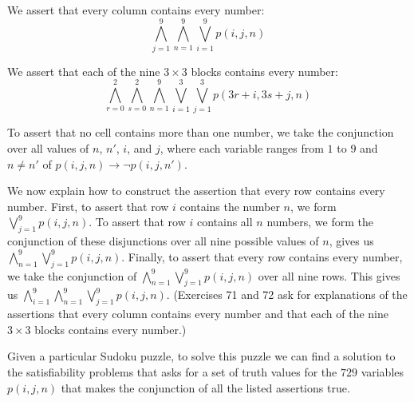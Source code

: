\documentclass{Axon}
\begin{document}
\begin{example}
    \begin{center}
        We assert that every column contains every number:
        \begin{equation*}
            \bigwedge_{j = 1}^9 \bigwedge_{n = 1}^9 \bigvee_{i = 1}^9 p(i, j, n)
        \end{equation*}
    \end{center}

    \begin{center}
        We assert that each of the nine \(3 \times 3\) blocks contains every number:
        \begin{equation*}
            \bigwedge_{r = 0}^2 \bigwedge_{s = 0}^2 \bigwedge_{n = 1}^9 \bigvee_{i = 1}^3 \bigvee_{j = 1}^3 p(3r + i, 3s + j, n)
        \end{equation*}
    \end{center}

    \begin{center}
        To assert that no cell contains more than one number, we take the conjunction over all values of \(n\), \(n'\), \(i\), and \(j\), where each variable ranges from \(1\) to \(9\) and \(n \neq n'\) of \(p(i, j, n) \to \lnot p(i, j, n')\).
    \end{center}

    We now explain how to construct the assertion that every row contains every number. First, to assert that row \(i\) contains the number \(n\), we form \(\bigvee_{j = 1}^9 p(i, j, n)\). To assert that row \(i\) contains all \(n\) numbers, we form the conjunction of these disjunctions over all nine possible values of \(n\), gives us \(\bigwedge_{n = 1}^9 \bigvee_{j = 1}^9 p(i, j, n)\). Finally, to assert that every row contains every number, we take the conjunction of \(\bigwedge_{n = 1}^9 \bigvee_{j = 1}^9 p(i, j, n)\) over all nine rows. This gives us \(\bigwedge_{i = 1}^9 \bigwedge_{n = 1}^9 \bigvee_{j = 1}^9 p(i, j, n)\). (Exercises 71 and 72 ask for explanations of the assertions that every column contains every number and that each of the nine \(3 \times 3\) blocks contains every number.)

    Given a particular Sudoku puzzle, to solve this puzzle we can find a solution to the satisfiability problems that asks for a set of truth values for the \(729\) variables \(p(i, j, n)\) that makes the conjunction of all the listed assertions true.
\end{example}

\printbibliography
\end{document}
